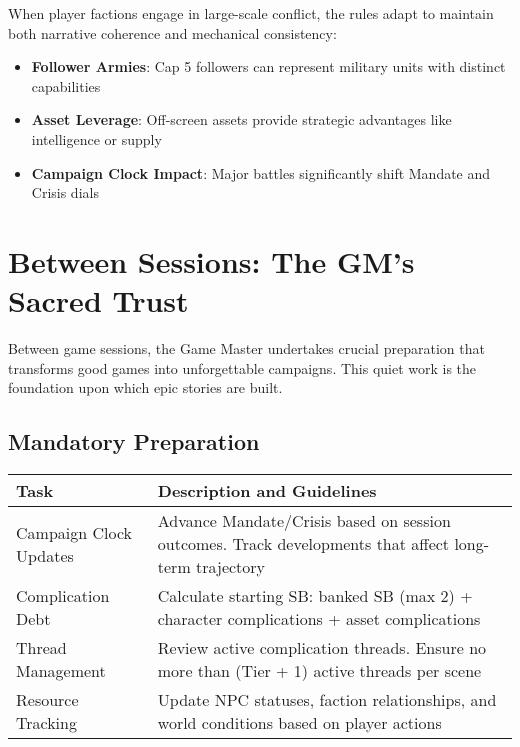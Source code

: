 When player factions engage in large-scale conflict, the rules adapt to maintain both narrative coherence and mechanical consistency:

\begin{itemize}
    \item \textbf{Follower Armies}: Cap 5 followers can represent military units with distinct capabilities
    \item \textbf{Asset Leverage}: Off-screen assets provide strategic advantages like intelligence or supply
    \item \textbf{Campaign Clock Impact}: Major battles significantly shift Mandate and Crisis dials
\end{itemize}

\section*{Between Sessions: The GM's Sacred Trust}

Between game sessions, the Game Master undertakes crucial preparation that transforms good games into unforgettable campaigns. This quiet work is the foundation upon which epic stories are built.

\subsection*{Mandatory Preparation}

\begin{fatebox}
\begin{tabularx}{\textwidth}{lX}
\toprule
\textbf{Task} & \textbf{Description and Guidelines} \\
\midrule
Campaign Clock Updates & Advance Mandate/Crisis based on session outcomes. Track developments that affect long-term trajectory \\
Complication Debt & Calculate starting SB: banked SB (max 2) + character complications + asset complications \\
Thread Management & Review active complication threads. Ensure no more than (Tier + 1) active threads per scene \\
Resource Tracking & Update NPC statuses, faction relationships, and world conditions based on player actions \\
\bottomrule
\end{tabularx}
\end{fatebox}


